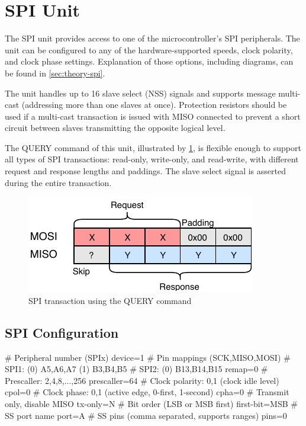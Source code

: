 \section{SPI Unit}

The \gls{SPI} unit provides access to one of the microcontroller's \gls{SPI} peripherals. The unit can be configured to any of the hardware-supported speeds, clock polarity, and clock phase settings. Explanation of those options, including diagrams, can be found in \cref{sec:theory-spi}.

The unit handles up to 16 slave select (\gls{NSS}) signals and supports message multi-cast (addressing more than one slaves at once). Protection resistors should be used if a multi-cast transaction is issued with \gls{MISO} connected to prevent a short circuit between slaves transmitting the opposite logical level.

The QUERY command of this unit, illustrated by \cref{fig:spi_query}, is flexible enough to support all types of \gls{SPI} transactions: read-only, write-only, and read-write, with different request and response lengths and paddings. The slave select signal is asserted during the entire transaction.

\begin{figure}[h]
	\centering
	\includegraphics[scale=1.1] {img/spi-query.pdf}
	\caption{\label{fig:spi_query}SPI transaction using the QUERY command}
\end{figure}

\subsection{SPI Configuration}

\begin{inicode}
# Peripheral number (SPIx)
device=1
# Pin mappings (SCK,MISO,MOSI)
#  SPI1: (0) A5,A6,A7     (1) B3,B4,B5
#  SPI2: (0) B13,B14,B15
remap=0
# Prescaller: 2,4,8,...,256
prescaller=64
# Clock polarity: 0,1 (clock idle level)
cpol=0
# Clock phase: 0,1 (active edge, 0-first, 1-second)
cpha=0
# Transmit only, disable MISO
tx-only=N
# Bit order (LSB or MSB first)
first-bit=MSB
# SS port name
port=A
# SS pins (comma separated, supports ranges)
pins=0
\end{inicode}

